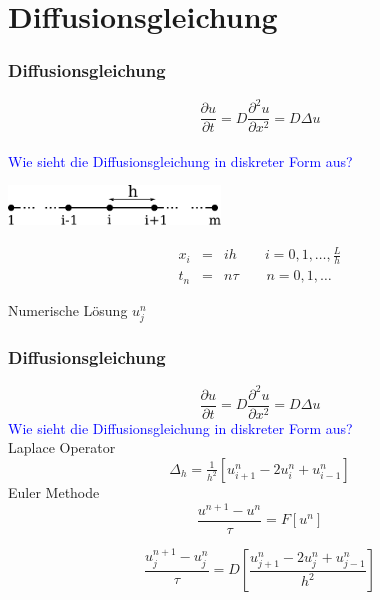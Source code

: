 \documentclass[10pt]{beamer}
\begin{document}
\section{Diffusionsgleichung}


\frame
{
  \frametitle{Diffusionsgleichung}
\begin{equation}
 \frac{\partial u}{\partial t} = D \frac{\partial^2 u}{\partial x^2} = D \Delta u \nonumber
\end{equation}
\\
\textcolor{blue} {Wie sieht die Diffusionsgleichung in diskreter Form aus?}\\
\begin{center}
\includegraphics[height=30pt]{img/differencegrid.pdf}
\begin{center}
 \begin{eqnarray*}
  x_i&=& i h \qquad i=0,1,\ldots,\frac{L}{h}\nonumber\\
  t_n&=& n \tau \qquad n=0,1,\ldots
 \end{eqnarray*}
\end{center}
Numerische Lösung $u_j^n$
\end{center}
}

\frame
{
  \frametitle{Diffusionsgleichung}
  \begin{equation}
  \frac{\partial u}{\partial t} = D \frac{\partial^2 u}{\partial x^2} = D \Delta u \nonumber
  \end{equation}
\textcolor{blue} {Wie sieht die Diffusionsgleichung in diskreter Form aus?}\\
Laplace Operator 
\begin{equation}
\Delta_h = \tfrac{1}{h^2}[u_{i+1}^n-2 u_i^n+u_{i-1}^n]
\end{equation}
Euler Methode
\begin{equation*}
\frac{u^{n+1} - u^{n}}{\tau} = F[u^{n}]
\end{equation*}

\begin{equation*}
\boxed{
 \frac{u_j^{n+1}-u_j^n}{\tau}= D\left[\frac{u_{j+1}^n-2 u_j^n+u_{j-1}^n}{h^2}\right]\nonumber
}
\end{equation*}
}
\end{document}
